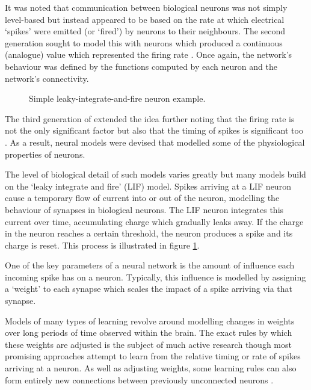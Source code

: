 			It was noted that communication between biological neurons was not simply
			level-based but instead appeared to be based on the rate at which
			electrical `spikes' were emitted (or `fired') by neurons to their
			neighbours. The second generation sought to model this with neurons which
			produced a continuous (analogue) value which represented the firing rate
			\cite{maass97}. Once again, the network's behaviour was defined by the
			functions computed by each neuron and the network's connectivity.
			
			\begin{figure}
				\center
				
				\caption{Simple leaky-integrate-and-fire neuron example.}
				\label{fig:snn-example}
			\end{figure}
			
			The third generation of extended the idea further noting that the firing
			rate is not the only significant factor but also that the timing of spikes
			is significant too \cite{maass01}. As a result, neural models were devised
			that modelled some of the physiological properties of neurons.
			
			The level of biological detail of such models varies greatly but many
			models build on the `leaky integrate and fire' (LIF) model.  Spikes
			arriving at a LIF neuron cause a temporary flow of current into or out of
			the neuron, modelling the behaviour of synapses in biological neurons. The
			LIF neuron integrates this current over time, accumulating charge which
			gradually leaks away. If the charge in the neuron reaches a certain
			threshold, the neuron produces a spike and its charge is reset. This
			process is illustrated in figure \ref{fig:snn-example}.
			
			One of the key parameters of a neural network is the amount of influence
			each incoming spike has on a neuron. Typically, this influence is modelled
			by assigning a `weight' to each synapse which scales the impact of a spike
			arriving via that synapse.
			
			Models of many types of learning revolve around modelling changes in
			weights over long periods of time observed within the brain. The exact
			rules by which these weights are adjusted is the subject of much active
			research though most promising approaches attempt to learn from the
			relative timing \cite{pfister06} or rate \cite{bienenstock82} of spikes
			arriving at a neuron. As well as adjusting weights, some learning rules
			can also form entirely new connections between previously unconnected
			neurons \cite{bamford10}.
		
